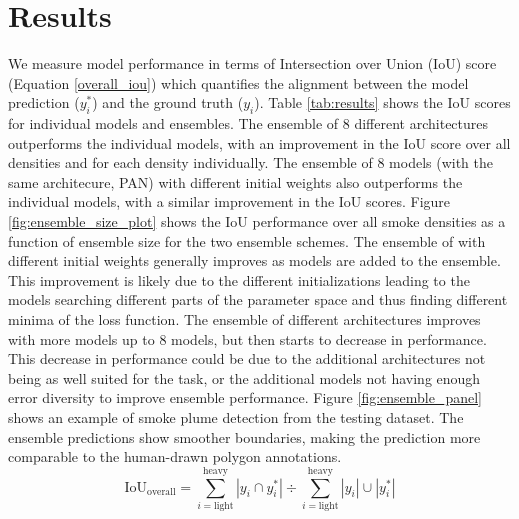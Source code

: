 \documentclass{article}
\begin{document}
\section{Results}
We measure model performance in terms of Intersection over Union (IoU) score (Equation \ref{overall_iou}) which quantifies the alignment between the model prediction ($ y^*_{i} $) and the ground truth ($y_{i}$). Table \ref{tab:results} shows the IoU scores for individual models and ensembles. The ensemble of 8 different architectures outperforms the individual models, with an improvement in the IoU score over all densities and for each density individually. The ensemble of 8 models (with the same architecure, PAN) with different initial weights also outperforms the individual models, with a similar improvement in the IoU scores. Figure \ref{fig:ensemble_size_plot} shows the IoU performance over all smoke densities as a function of ensemble size for the two ensemble schemes. The ensemble of with different initial weights generally improves as models are added to the ensemble. This improvement is likely due to the different initializations leading to the models searching different parts of the parameter space and thus finding different minima of the loss function. The ensemble of different architectures improves with more models up to 8 models, but then starts to decrease in performance. This decrease in performance could be due to the additional architectures not being as well suited for the task, or the additional models not having enough error diversity to improve ensemble performance.
Figure \ref{fig:ensemble_panel} shows an example of smoke plume detection from the testing dataset. The ensemble predictions show smoother boundaries, making the prediction more comparable to the human-drawn polygon annotations.
\begin{equation} \label{overall_iou}
    \text{IoU}_{\text{overall}} = {\sum\limits_{i=\text{light}}^{\text{heavy}}|y_{i}\cap y^*_{i}|} \div {\sum\limits_{i=\text{light}}^{\text{heavy}}|y_{i}|\cup|y^*_{i}|}
\end{equation}
\end{document}
